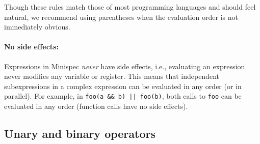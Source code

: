 Though these rules match those of most programming languages and should feel natural,
we recommend using parentheses when the evaluation order is not immediately obvious.

\paragraph{No side effects:} Expressions in Minispec \emph{never} have side effects,
i.e., evaluating an expression never modifies any variable or register.
This means that independent subexpressions in a complex expression can be evaluated in any order (or in parallel).
For example, in \texttt{foo(a \&\& b) || foo(b)}, both calls to \texttt{foo}
can be evaluated in any order (function calls have no side effects).



\subsection{Unary and binary operators}

